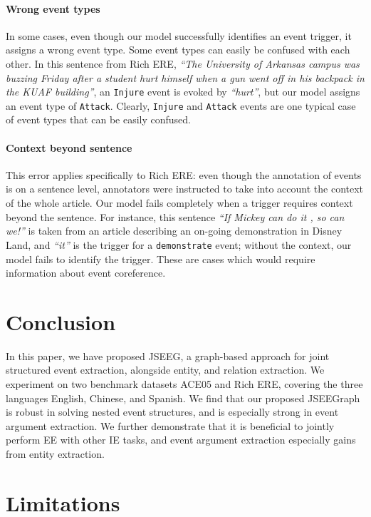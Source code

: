 \documentclass[11pt]{article}
\begin{document}
\paragraph{\textbf{Wrong event types}} In some cases, even though our model successfully identifies an event trigger, it assigns a wrong event type. Some event types can easily be confused with each other. In this sentence from Rich ERE, \textit{``The University of Arkansas campus was buzzing Friday after a student hurt himself when a gun went off in his backpack in the KUAF building''}, an \texttt{Injure} event is evoked by \textit{``hurt''}, but our model assigns an event type of \texttt{Attack}. Clearly, \texttt{Injure} and \texttt{Attack} events are one typical case of event types that can be easily confused.

\paragraph{\textbf{Context beyond sentence}} This error applies specifically to Rich ERE: even though the annotation of events is on a sentence level, annotators were instructed to take into account the context of the whole article. Our model fails completely when a trigger requires context beyond the sentence. For instance, this sentence \textit{``If Mickey can do it , so can we!''} is taken from an article describing an on-going demonstration in Disney Land, and \textit{``it''} is the trigger for a \texttt{demonstrate} event; without the context, our model fails to identify the trigger. These are cases which would require information about event coreference.


\section{Conclusion}
\label{sec:conclusion}

In this paper, we have proposed JSEEG, a graph-based approach for joint structured event extraction, alongside entity, and relation extraction. We experiment on two benchmark datasets ACE05 and Rich ERE, covering the three languages English, Chinese, and Spanish. We find that our proposed JSEEGraph is robust in solving nested event structures, and is especially strong in event argument extraction. We further demonstrate that it is beneficial to jointly perform EE with other IE tasks, and event argument extraction especially gains from entity extraction.

\section*{Limitations}
\label{sec:limitations}
\end{document}

